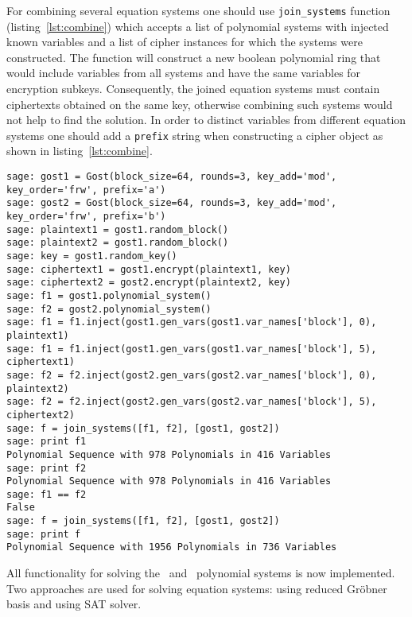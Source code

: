 For combining several equation systems one should use \verb+join_systems+
function (listing~\ref{lst:combine}) which accepts a list of polynomial systems
with injected known variables and a list of cipher instances for which the
systems were constructed. The function will construct a new boolean polynomial
ring that would include variables from all systems and have the same variables
for encryption subkeys. Consequently, the joined equation systems must contain ciphertexts
obtained on the same key, otherwise combining such systems would not help to
find the solution. In order to distinct variables from different equation systems
one should add a \verb+prefix+ string when constructing a cipher object as
shown in listing~\ref{lst:combine}.
\begin{lstlisting}[label=lst:combine, caption=Combining several equation systems]
sage: gost1 = Gost(block_size=64, rounds=3, key_add='mod', key_order='frw', prefix='a')
sage: gost2 = Gost(block_size=64, rounds=3, key_add='mod', key_order='frw', prefix='b')
sage: plaintext1 = gost1.random_block()
sage: plaintext2 = gost1.random_block()
sage: key = gost1.random_key()
sage: ciphertext1 = gost1.encrypt(plaintext1, key)
sage: ciphertext2 = gost2.encrypt(plaintext2, key)
sage: f1 = gost1.polynomial_system()
sage: f2 = gost2.polynomial_system()
sage: f1 = f1.inject(gost1.gen_vars(gost1.var_names['block'], 0), plaintext1)
sage: f1 = f1.inject(gost1.gen_vars(gost1.var_names['block'], 5), ciphertext1)
sage: f2 = f2.inject(gost2.gen_vars(gost2.var_names['block'], 0), plaintext2)
sage: f2 = f2.inject(gost2.gen_vars(gost2.var_names['block'], 5), ciphertext2)
sage: f = join_systems([f1, f2], [gost1, gost2])
sage: print f1
Polynomial Sequence with 978 Polynomials in 416 Variables
sage: print f2
Polynomial Sequence with 978 Polynomials in 416 Variables
sage: f1 == f2
False
sage: f = join_systems([f1, f2], [gost1, gost2])
sage: print f
Polynomial Sequence with 1956 Polynomials in 736 Variables
\end{lstlisting}


All functionality for solving the \gost\ and \misty\  polynomial systems is now
implemented.  Two approaches are used for solving equation systems: using
reduced Gr\"obner basis and using SAT solver.


